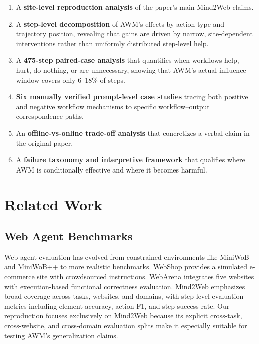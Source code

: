 \documentclass{article}
\providecommand{\tightlist}{%
  \setlength{\itemsep}{0pt}\setlength{\parskip}{0.8em}}
\begin{document}
\begin{enumerate}
\def\labelenumi{\arabic{enumi}.}
\tightlist
\item
  A \textbf{site-level reproduction analysis} of the paper's main
  Mind2Web claims.
\item
  A \textbf{step-level decomposition} of AWM's effects by action type
  and trajectory position, revealing that gains are driven by narrow,
  site-dependent interventions rather than uniformly distributed step-level help.
\item
  A \textbf{475-step paired-case analysis} that quantifies when
  workflows help, hurt, do nothing, or are unnecessary, showing that
  AWM's actual influence window covers only 6--18\% of steps.
\item
  \textbf{Six manually verified prompt-level case studies} tracing both
  positive and negative workflow mechanisms to specific workflow--output
  correspondence paths.
\item
  An \textbf{offline-vs-online trade-off analysis} that concretizes a
  verbal claim in the original paper.
\item
  A \textbf{failure taxonomy and interpretive framework} that qualifies
  where AWM is conditionally effective and where it becomes harmful.
\end{enumerate}

\section{Related Work}\label{related-work}

\subsection{Web Agent Benchmarks}\label{web-agent-benchmarks}

Web-agent evaluation has evolved from constrained environments like
MiniWoB \parencite{shi2017world} and MiniWoB++
\parencite{liu2018reinforcement} to more realistic benchmarks. WebShop
\parencite{yao2022webshop} provides a simulated e-commerce site with
crowdsourced instructions. WebArena \parencite{zhou2023webarena}
integrates five websites with execution-based functional correctness
evaluation. Mind2Web \parencite{deng2023mind2web} emphasizes broad
coverage across tasks, websites, and domains, with step-level evaluation
metrics including element accuracy, action F1, and step success rate.
Our reproduction focuses exclusively on Mind2Web because its explicit
cross-task, cross-website, and cross-domain evaluation splits make it
especially suitable for testing AWM's generalization claims.
\end{document}
